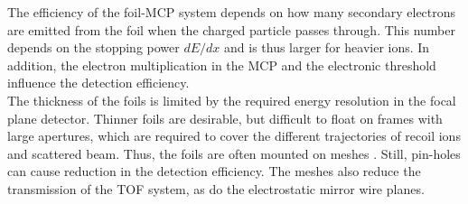 The efficiency of the foil-MCP system depends on how many secondary electrons are emitted from the foil when the charged particle passes through. This number depends on the stopping power $dE/dx$ and is thus larger for heavier ions. In addition, the electron multiplication in the MCP and the electronic threshold influence the detection efficiency.\\
The thickness of the foils is limited by the required energy resolution in the focal plane detector. Thinner foils are desirable, but difficult to float on frames with large apertures, which are required to cover the different trajectories of recoil ions and scattered beam. Thus, the foils are often mounted on meshes \cite{vock09}. Still, pin-holes can cause reduction in the detection efficiency. The meshes also reduce the transmission of the TOF system, as do the electrostatic mirror wire planes. 


